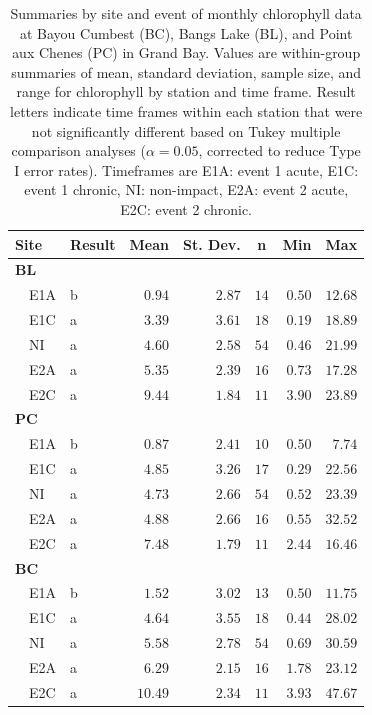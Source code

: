 \documentclass[letterpaper,12pt]{article}\usepackage[]{graphicx}\usepackage[]{color}
\begin{document}
\begin{table}[!tbp]
\caption{Summaries by site and event of monthly chlorophyll data at Bayou Cumbest (BC), Bangs Lake (BL), and Point aux Chenes (PC) in Grand Bay.  Values are within-group summaries of mean, standard deviation, sample size, and range for chlorophyll by station and time frame.  Result letters indicate time frames within each station that were not significantly different based on Tukey multiple comparison analyses ($\alpha = 0.05$, corrected to reduce Type I error rates). Timeframes are E1A: event 1 acute, E1C: event 1 chronic, NI: non-impact, E2A: event 2 acute, E2C: event 2 chronic.\label{tab:chltab}} 
\begin{center}
\begin{tabular}{llrrrrr}
\hline\hline
\multicolumn{1}{l}{Site}&\multicolumn{1}{c}{Result}&\multicolumn{1}{c}{Mean}&\multicolumn{1}{c}{St. Dev.}&\multicolumn{1}{c}{n}&\multicolumn{1}{c}{Min}&\multicolumn{1}{c}{Max}\tabularnewline
\hline
{\bfseries BL}&&&&&&\tabularnewline
~~E1A&b&$ 0.94$&$2.87$&$14$&$0.50$&$12.68$\tabularnewline
~~E1C&a&$ 3.39$&$3.61$&$18$&$0.19$&$18.89$\tabularnewline
~~NI&a&$ 4.60$&$2.58$&$54$&$0.46$&$21.99$\tabularnewline
~~E2A&a&$ 5.35$&$2.39$&$16$&$0.73$&$17.28$\tabularnewline
~~E2C&a&$ 9.44$&$1.84$&$11$&$3.90$&$23.89$\tabularnewline
\hline
{\bfseries PC}&&&&&&\tabularnewline
~~E1A&b&$ 0.87$&$2.41$&$10$&$0.50$&$ 7.74$\tabularnewline
~~E1C&a&$ 4.85$&$3.26$&$17$&$0.29$&$22.56$\tabularnewline
~~NI&a&$ 4.73$&$2.66$&$54$&$0.52$&$23.39$\tabularnewline
~~E2A&a&$ 4.88$&$2.66$&$16$&$0.55$&$32.52$\tabularnewline
~~E2C&a&$ 7.48$&$1.79$&$11$&$2.44$&$16.46$\tabularnewline
\hline
{\bfseries BC}&&&&&&\tabularnewline
~~E1A&b&$ 1.52$&$3.02$&$13$&$0.50$&$11.75$\tabularnewline
~~E1C&a&$ 4.64$&$3.55$&$18$&$0.44$&$28.02$\tabularnewline
~~NI&a&$ 5.58$&$2.78$&$54$&$0.69$&$30.59$\tabularnewline
~~E2A&a&$ 6.29$&$2.15$&$16$&$1.78$&$23.12$\tabularnewline
~~E2C&a&$10.49$&$2.34$&$11$&$3.93$&$47.67$\tabularnewline
\hline
\end{tabular}\end{center}

\end{table}

\clearpage
\end{document}
